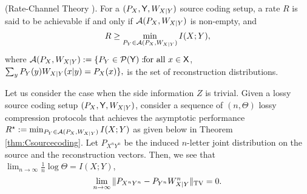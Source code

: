 \begin{theorem}\label{thm:Csourcecoding}(Rate-Channel Theory \cite[Theorem 2]{sohail2023unique}). For a $({P}_X,\mathsf{Y},W_{X|Y})$ source coding setup, a rate $R$ is said to be achievable if and only if $\mathcal{A}({P}_X,W_{X|Y})$ is non-empty, and \begin{equation}\label{eqn:clsratedistortion}R \geq \min_{P_Y \in \calA(\px,W_{X|Y})} I(X;Y), \vspace{-5pt}\end{equation}
where $\mathcal{A}({P}_X,W_{X|Y}) := \{P_Y \in \mathcal{P}(\mathsf{Y}): \!\! \text{for all }  x \in \mathsf{X}$, $ 
\sum_{y} P_{Y}(y) W_{X|Y}(x|y) = {P}_X(x)\},$ is the set of reconstruction distributions.
\end{theorem}
Let us consider the case when the side information $Z$ is trivial. 
Given a lossy source coding setup $({P}_X,\mathsf{Y},W_{X|Y})$, 
consider a sequence of 
$(n,\Theta)$
lossy compression protocols 
that achieves the asymptotic performance  $R^\star := \min_{P_Y \in \mathcal{A}(P_X,W_{X|Y})} I(X;Y)$
as given below in Theorem \ref{thm:Csourcecoding}.
Let 
$P_{X^nY^n}$ be the induced $n$-letter joint distribution on the source and the reconstruction vectors. 
Then, we see that 
$\lim_{n \rightarrow \infty} \frac{1}{n} \log \Theta =I(X;Y)$,
$$\lim_{n\rightarrow\infty}\|P_{X^nY^n} -
    P_{Y^n}W_{X|Y}^n\|_{\normalfont \text{TV}} = 0.$$



